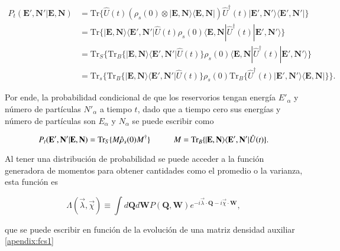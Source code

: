 \begin{align*} 
    P_{t}(\textbf{E}',\textbf{N}'|\textbf{E},\textbf{N}) & =  \text{Tr}\{\hat{U}(t)(\rho_{s}(0)\otimes |\textbf{E}, \textbf{N}\rangle  \langle \textbf{E}, \textbf{N}| ) \hat{U}^{\dagger}(t)  |\textbf{E}', \textbf{N}'\rangle  \langle \textbf{E}', \textbf{N}'| \} \\
        & =  \text{Tr}\{|\textbf{E},\textbf{N} \rangle \langle \textbf{E}', \textbf{N}'| \hat{U}(t)\rho_{s}(0) \langle \textbf{E}, \textbf{N}|\hat{U}^{\dagger}(t)|\textbf{E}', \textbf{N}'\rangle \}      \\ 
        & = \text{Tr}_{S}\{ \text{Tr}_{B}\{|\textbf{E},\textbf{N} \rangle \langle \textbf{E}', \textbf{N}'|\hat{U}(t) \}\rho_{s}(0)\langle \textbf{E}, \textbf{N}|\hat{U}^{\dagger}(t)|\textbf{E}', \textbf{N}'\rangle      \} \\
        & = \text{Tr}_{s}\{ \text{Tr}_{B}\{|\textbf{E},\textbf{N}\rangle \langle \textbf{E}',\textbf{N}'|\hat{U}(t)  \} \rho_{s}(0) \text{Tr}_{B}\{\hat{U}^{\dagger}(t) |\textbf{E}',\textbf{N}' \rangle \langle \textbf{E},\textbf{N}| \}     \}.
    \end{align*}    

Por ende, la probabilidad condicional de que los reservorios tengan energía $E'_{\alpha}$ y número de partículas $N'_{\alpha}$ a tiempo $t$, dado que a tiempo cero sus energías y número de partículas son $E_{\alpha}$ y $N_{\alpha}$ se puede escribir como

\begin{equation*}
    P_{t}(\textbf{E}',\textbf{N}'|\textbf{E},\textbf{N}) = \text{Tr}_{S}\{M \hat{\rho}_{s}(0)M^{\dagger} \}  \hspace{10mm} M = \text{Tr}_{B}\{|\textbf{E},\textbf{N} \rangle \langle \textbf{E}',\textbf{N}' | \hat{U}(t)\}.
\end{equation*}

Al tener una distribución de probabilidad se puede acceder a la función generadora de momentos para obtener cantidades como el promedio o la varianza, esta función es

\begin{equation}
    \Lambda(\vec{\lambda},\vec{\chi}) \equiv \int d\textbf{Q} d\textbf{W}P(\textbf{Q},\textbf{W}) e^{-i\vec{\lambda}\cdot \textbf{Q} -i\vec{\chi}\cdot \textbf{W} },
\label{sec2funciongeneradora}
\end{equation}

que se puede escribir en función de la evolución de una matriz densidad auxiliar \ref{apendix:fcs1}

